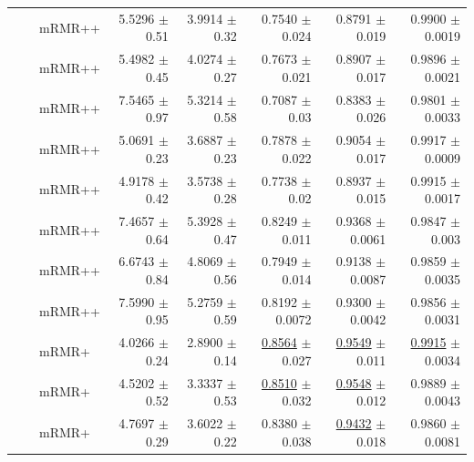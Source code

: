 \begin{longtable}{llp{}rrrrr}
 &  & mRMR++ & 5.5296 {\scriptsize $\pm$ 0.51} & 3.9914 {\scriptsize $\pm$ 0.32} & 0.7540 {\scriptsize $\pm$ 0.024} & 0.8791 {\scriptsize $\pm$ 0.019} & 0.9900 {\scriptsize $\pm$ 0.0019} \\
 &  & mRMR++ & 5.4982 {\scriptsize $\pm$ 0.45} & 4.0274 {\scriptsize $\pm$ 0.27} & 0.7673 {\scriptsize $\pm$ 0.021} & 0.8907 {\scriptsize $\pm$ 0.017} & 0.9896 {\scriptsize $\pm$ 0.0021} \\
 &  & mRMR++ & 7.5465 {\scriptsize $\pm$ 0.97} & 5.3214 {\scriptsize $\pm$ 0.58} & 0.7087 {\scriptsize $\pm$ 0.03} & 0.8383 {\scriptsize $\pm$ 0.026} & 0.9801 {\scriptsize $\pm$ 0.0033} \\
 &  & mRMR++ & 5.0691 {\scriptsize $\pm$ 0.23} & 3.6887 {\scriptsize $\pm$ 0.23} & 0.7878 {\scriptsize $\pm$ 0.022} & 0.9054 {\scriptsize $\pm$ 0.017} & 0.9917 {\scriptsize $\pm$ 0.0009} \\
 &  & mRMR++ & 4.9178 {\scriptsize $\pm$ 0.42} & 3.5738 {\scriptsize $\pm$ 0.28} & 0.7738 {\scriptsize $\pm$ 0.02} & 0.8937 {\scriptsize $\pm$ 0.015} & 0.9915 {\scriptsize $\pm$ 0.0017} \\
 &  & mRMR++ & 7.4657 {\scriptsize $\pm$ 0.64} & 5.3928 {\scriptsize $\pm$ 0.47} & 0.8249 {\scriptsize $\pm$ 0.011} & 0.9368 {\scriptsize $\pm$ 0.0061} & 0.9847 {\scriptsize $\pm$ 0.003} \\
 &  & mRMR++ & 6.6743 {\scriptsize $\pm$ 0.84} & 4.8069 {\scriptsize $\pm$ 0.56} & 0.7949 {\scriptsize $\pm$ 0.014} & 0.9138 {\scriptsize $\pm$ 0.0087} & 0.9859 {\scriptsize $\pm$ 0.0035} \\
 &  & mRMR++ & 7.5990 {\scriptsize $\pm$ 0.95} & 5.2759 {\scriptsize $\pm$ 0.59} & 0.8192 {\scriptsize $\pm$ 0.0072} & 0.9300 {\scriptsize $\pm$ 0.0042} & 0.9856 {\scriptsize $\pm$ 0.0031} \\
 &  & mRMR+ & 4.0266 {\scriptsize $\pm$ 0.24} & 2.8900 {\scriptsize $\pm$ 0.14} & \underline{0.8564} {\scriptsize $\pm$ 0.027} & \underline{0.9549} {\scriptsize $\pm$ 0.011} & \underline{0.9915} {\scriptsize $\pm$ 0.0034} \\
 &  & mRMR+ & 4.5202 {\scriptsize $\pm$ 0.52} & 3.3337 {\scriptsize $\pm$ 0.53} & \underline{0.8510} {\scriptsize $\pm$ 0.032} & \underline{0.9548} {\scriptsize $\pm$ 0.012} & 0.9889 {\scriptsize $\pm$ 0.0043} \\
 &  & mRMR+ & 4.7697 {\scriptsize $\pm$ 0.29} & 3.6022 {\scriptsize $\pm$ 0.22} & 0.8380 {\scriptsize $\pm$ 0.038} & \underline{0.9432} {\scriptsize $\pm$ 0.018} & 0.9860 {\scriptsize $\pm$ 0.0081} \\

\end{longtable}
